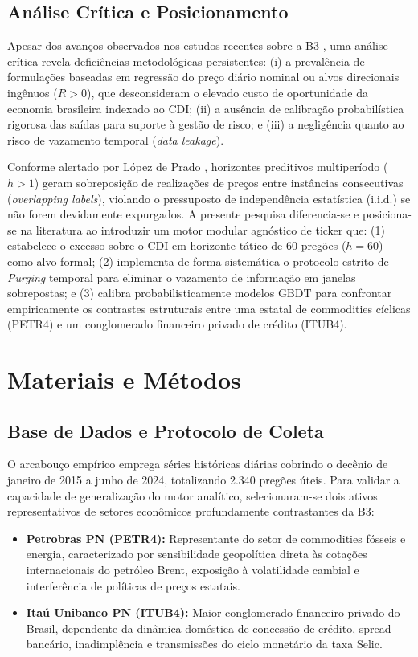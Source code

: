 \documentclass[conference]{IEEEtran}
\begin{document}
\subsection{Análise Crítica e Posicionamento}
Apesar dos avanços observados nos estudos recentes sobre a B3 \cite{rosa2025brazilian, silva2024poder, carosia2023using}, uma análise crítica revela deficiências metodológicas persistentes: (i) a prevalência de formulações baseadas em regressão do preço diário nominal ou alvos direcionais ingênuos ($R > 0$), que desconsideram o elevado custo de oportunidade da economia brasileira indexado ao CDI; (ii) a ausência de calibração probabilística rigorosa das saídas para suporte à gestão de risco; e (iii) a negligência quanto ao risco de vazamento temporal (\textit{data leakage}).

Conforme alertado por López de Prado \cite{deprado2018advances}, horizontes preditivos multiperíodo ($h > 1$) geram sobreposição de realizações de preços entre instâncias consecutivas (\textit{overlapping labels}), violando o pressuposto de independência estatística (i.i.d.) se não forem devidamente expurgados. A presente pesquisa diferencia-se e posiciona-se na literatura ao introduzir um motor modular agnóstico de ticker que: (1) estabelece o excesso sobre o CDI em horizonte tático de 60 pregões ($h=60$) como alvo formal; (2) implementa de forma sistemática o protocolo estrito de \textit{Purging} temporal para eliminar o vazamento de informação em janelas sobrepostas; e (3) calibra probabilisticamente modelos GBDT para confrontar empiricamente os contrastes estruturais entre uma estatal de commodities cíclicas (PETR4) e um conglomerado financeiro privado de crédito (ITUB4).

\section{Materiais e Métodos}

\subsection{Base de Dados e Protocolo de Coleta}
O arcabouço empírico emprega séries históricas diárias cobrindo o decênio de janeiro de 2015 a junho de 2024, totalizando 2.340 pregões úteis. Para validar a capacidade de generalização do motor analítico, selecionaram-se dois ativos representativos de setores econômicos profundamente contrastantes da B3:
\begin{itemize}
    \item \textbf{Petrobras PN (PETR4):} Representante do setor de commodities fósseis e energia, caracterizado por sensibilidade geopolítica direta às cotações internacionais do petróleo Brent, exposição à volatilidade cambial e interferência de políticas de preços estatais.
    \item \textbf{Itaú Unibanco PN (ITUB4):} Maior conglomerado financeiro privado do Brasil, dependente da dinâmica doméstica de concessão de crédito, spread bancário, inadimplência e transmissões do ciclo monetário da taxa Selic.
\end{itemize}
\end{document}
